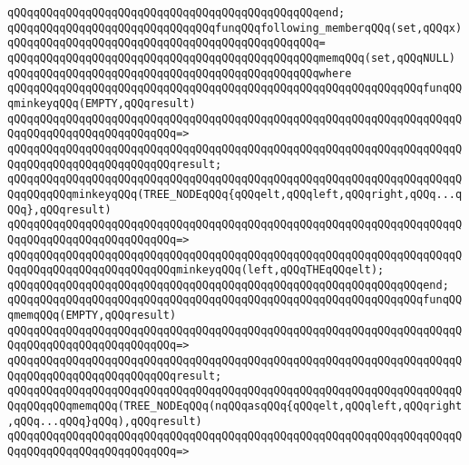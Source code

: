 \verb|qQQqqQQqqQQqqQQqqQQqqQQqqQQqqQQqqQQqqQQqqQQqqQQqend;|\newline
\verb|qQQqqQQqqQQqqQQqqQQqqQQqqQQqqQQqfunqQQqfollowing_memberqQQq(set,qQQqx)|\newline
\verb|qQQqqQQqqQQqqQQqqQQqqQQqqQQqqQQqqQQqqQQqqQQqqQQq=|\newline
\verb|qQQqqQQqqQQqqQQqqQQqqQQqqQQqqQQqqQQqqQQqqQQqqQQqmemqQQq(set,qQQqNULL)|\newline
\verb|qQQqqQQqqQQqqQQqqQQqqQQqqQQqqQQqqQQqqQQqqQQqqQQqwhere|\newline
\verb|qQQqqQQqqQQqqQQqqQQqqQQqqQQqqQQqqQQqqQQqqQQqqQQqqQQqqQQqqQQqqQQqfunqQQqminkeyqQQq(EMPTY,qQQqresult)|\newline
\verb|qQQqqQQqqQQqqQQqqQQqqQQqqQQqqQQqqQQqqQQqqQQqqQQqqQQqqQQqqQQqqQQqqQQqqQQqqQQqqQQqqQQqqQQqqQQqqQQq=>|\newline
\verb|qQQqqQQqqQQqqQQqqQQqqQQqqQQqqQQqqQQqqQQqqQQqqQQqqQQqqQQqqQQqqQQqqQQqqQQqqQQqqQQqqQQqqQQqqQQqqQQqresult;|\newline
\newline
\verb|qQQqqQQqqQQqqQQqqQQqqQQqqQQqqQQqqQQqqQQqqQQqqQQqqQQqqQQqqQQqqQQqqQQqqQQqqQQqqQQqminkeyqQQq(TREE_NODEqQQq{qQQqelt,qQQqleft,qQQqright,qQQq...qQQq},qQQqresult)|\newline
\verb|qQQqqQQqqQQqqQQqqQQqqQQqqQQqqQQqqQQqqQQqqQQqqQQqqQQqqQQqqQQqqQQqqQQqqQQqqQQqqQQqqQQqqQQqqQQqqQQq=>|\newline
\verb|qQQqqQQqqQQqqQQqqQQqqQQqqQQqqQQqqQQqqQQqqQQqqQQqqQQqqQQqqQQqqQQqqQQqqQQqqQQqqQQqqQQqqQQqqQQqqQQqminkeyqQQq(left,qQQqTHEqQQqelt);|\newline
\verb|qQQqqQQqqQQqqQQqqQQqqQQqqQQqqQQqqQQqqQQqqQQqqQQqqQQqqQQqqQQqqQQqend;|\newline
\newline
\verb|qQQqqQQqqQQqqQQqqQQqqQQqqQQqqQQqqQQqqQQqqQQqqQQqqQQqqQQqqQQqqQQqfunqQQqmemqQQq(EMPTY,qQQqresult)|\newline
\verb|qQQqqQQqqQQqqQQqqQQqqQQqqQQqqQQqqQQqqQQqqQQqqQQqqQQqqQQqqQQqqQQqqQQqqQQqqQQqqQQqqQQqqQQqqQQqqQQq=>|\newline
\verb|qQQqqQQqqQQqqQQqqQQqqQQqqQQqqQQqqQQqqQQqqQQqqQQqqQQqqQQqqQQqqQQqqQQqqQQqqQQqqQQqqQQqqQQqqQQqqQQqresult;|\newline
\newline
\verb|qQQqqQQqqQQqqQQqqQQqqQQqqQQqqQQqqQQqqQQqqQQqqQQqqQQqqQQqqQQqqQQqqQQqqQQqqQQqqQQqmemqQQq(TREE_NODEqQQq(nqQQqasqQQq{qQQqelt,qQQqleft,qQQqright,qQQq...qQQq}qQQq),qQQqresult)|\newline
\verb|qQQqqQQqqQQqqQQqqQQqqQQqqQQqqQQqqQQqqQQqqQQqqQQqqQQqqQQqqQQqqQQqqQQqqQQqqQQqqQQqqQQqqQQqqQQqqQQq=>|\newline
